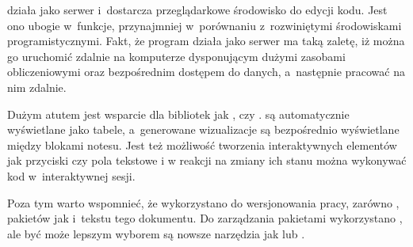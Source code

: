 działa jako serwer  i~dostarcza przeglądarkowe środowisko do edycji kodu. Jest ono
ubogie w~funkcje, przynajmniej w~porównaniu z~rozwiniętymi środowiskami programistycznymi. Fakt, że
program działa jako serwer ma taką zaletę, iż można go uruchomić zdalnie na komputerze dysponującym dużymi zasobami
obliczeniowymi oraz bezpośrednim dostępem do danych, a~następnie pracować na nim zdalnie.

Dużym atutem jest wsparcie dla bibliotek jak ,  czy .
 są automatycznie wyświetlane jako tabele, a~generowane wizualizacje są bezpośrednio wyświetlane
między blokami notesu. Jest też możliwość tworzenia interaktywnych elementów jak przyciski czy pola tekstowe i
w reakcji na zmiany ich stanu można wykonywać kod w~interaktywnej sesji.

Poza tym warto wspomnieć, że wykorzystano  do wersjonowania pracy, zarówno , pakietów jak i~tekstu tego dokumentu. Do zarządzania pakietami wykorzystano , ale być może lepszym wyborem są nowsze narzędzia jak  lub .

